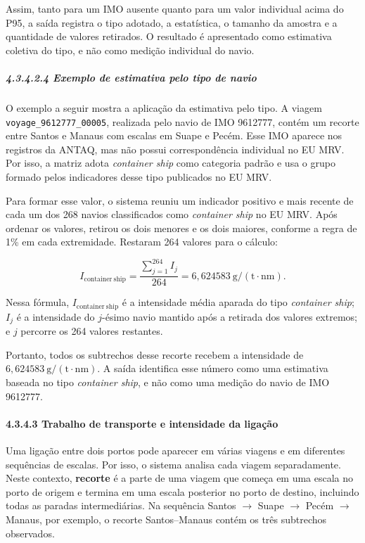 \documentclass[brazil,]{article}
\let\oldparagraph\paragraph
\renewcommand{\paragraph}[1]{\Needspace{7\baselineskip}\oldparagraph{#1}\mbox{}}
\let\oldsubparagraph\subparagraph
\renewcommand{\subparagraph}[1]{\Needspace{6\baselineskip}\oldsubparagraph{#1}\mbox{}}
\begin{document}
Assim, tanto para um IMO ausente quanto para um valor individual acima
do P95, a saída registra o tipo adotado, a estatística, o tamanho da
amostra e a quantidade de valores retirados. O resultado é apresentado
como estimativa coletiva do tipo, e não como medição individual do
navio.

\hypertarget{exemplo-de-estimativa-pelo-tipo-de-navio}{%
\subparagraph{4.3.4.2.4 Exemplo de estimativa pelo tipo de
navio}\label{exemplo-de-estimativa-pelo-tipo-de-navio}}

O exemplo a seguir mostra a aplicação da estimativa pelo tipo. A viagem
\texttt{voyage\_9612777\_00005}, realizada pelo navio de IMO 9612777,
contém um recorte entre Santos e Manaus com escalas em Suape e Pecém.
Esse IMO aparece nos registros da ANTAQ, mas não possui correspondência
individual no EU MRV. Por isso, a matriz adota \emph{container ship}
como categoria padrão e usa o grupo formado pelos indicadores desse tipo
publicados no EU MRV.

Para formar esse valor, o sistema reuniu um indicador positivo e mais
recente de cada um dos 268 navios classificados como \emph{container
ship} no EU MRV. Após ordenar os valores, retirou os dois menores e os
dois maiores, conforme a regra de 1\% em cada extremidade. Restaram 264
valores para o cálculo:

\[
I_{\mathrm{container\ ship}}
=\frac{\sum_{j=1}^{264} I_j}{264}
=6{,}624583\ \mathrm{g/(t\cdot nm)}.
\]

Nessa fórmula, \(I_{\mathrm{container\ ship}}\) é a intensidade média
aparada do tipo \emph{container ship}; \(I_j\) é a intensidade do
\(j\)-ésimo navio mantido após a retirada dos valores extremos; e \(j\)
percorre os 264 valores restantes.

Portanto, todos os subtrechos desse recorte recebem a intensidade de
\(6{,}624583\ \mathrm{g/(t\cdot nm)}\). A saída identifica esse número
como uma estimativa baseada no tipo \emph{container ship}, e não como
uma medição do navio de IMO 9612777.

\hypertarget{trabalho-de-transporte-e-intensidade-da-ligauxe7uxe3o}{%
\paragraph{4.3.4.3 Trabalho de transporte e intensidade da
ligação}\label{trabalho-de-transporte-e-intensidade-da-ligauxe7uxe3o}}

Uma ligação entre dois portos pode aparecer em várias viagens e em
diferentes sequências de escalas. Por isso, o sistema analisa cada
viagem separadamente. Neste contexto, \textbf{recorte} é a parte de uma
viagem que começa em uma escala no porto de origem e termina em uma
escala posterior no porto de destino, incluindo todas as paradas
intermediárias. Na sequência Santos \(\rightarrow\) Suape
\(\rightarrow\) Pecém \(\rightarrow\) Manaus, por exemplo, o recorte
Santos--Manaus contém os três subtrechos observados.
\end{document}
